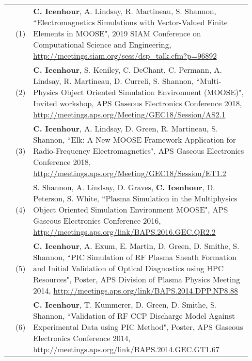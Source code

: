 \documentclass{article}
\begin{document}
	\begin{tabularx}{\textwidth}{l l X}
		\hspace{2em}
			& (1)  & \textbf{C. Icenhour}, A. Lindsay, R. Martineau, S. Shannon, ``Electromagnetics Simulations with Vector-Valued Finite Elements in MOOSE", 2019 SIAM Conference on Computational Science and Engineering, \url{http://meetings.siam.org/sess/dsp_talk.cfm?p=96892} \\
			& (2)  & \textbf{C. Icenhour}, S. Keniley, C. DeChant, C. Permann, A. Lindsay, R. Martineau, D. Curreli, S. Shannon, ``Multi-Physics Object Oriented Simulation Environment (MOOSE)", Invited workshop, APS Gaseous Electronics Conference 2018, \url{http://meetings.aps.org/Meeting/GEC18/Session/AS2.1} \\
			& (3)  & \textbf{C. Icenhour}, A. Lindsay, D. Green, R. Martineau, S. Shannon, ``Elk: A New MOOSE Framework Application for Radio-Frequency Electromagnetics", APS Gaseous Electronics Conference 2018, \url{http://meetings.aps.org/Meeting/GEC18/Session/ET1.2} \\
			& (4)  &  S. Shannon, A. Lindsay, D. Graves, \textbf{C. Icenhour}, D. Peterson, S. White, ``Plasma Simulation in the Multiphysics Object Oriented Simulation Environment MOOSE", APS Gaseous Electronics Conference 2016, \newline \url{http://meetings.aps.org/link/BAPS.2016.GEC.QR2.2} \\
			& (5)  & \textbf{C. Icenhour}, A. Exum, E. Martin, D. Green, D. Smithe, S. Shannon, ``PIC Simulation of RF Plasma Sheath Formation and Initial Validation of Optical Diagnostics using HPC Resources", Poster, APS Division of Plasma Physics Meeting 2014, \url{http://meetings.aps.org/link/BAPS.2014.DPP.NP8.88} \\
			& (6)  & \textbf{C. Icenhour}, T. Kummerer, D. Green, D. Smithe, S. Shannon, ``Validation of RF CCP Discharge Model Against Experimental Data using PIC Method", Poster, APS Gaseous Electronics Conference 2014, \newline \url{http://meetings.aps.org/link/BAPS.2014.GEC.GT1.67}
	\end{tabularx}
\end{document}
